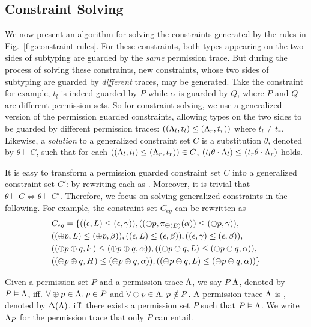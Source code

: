 {{{ \subsection{Constraint Solving}\label{sec:constraint_solve}
We now present an algorithm for solving the constraints generated by the rules in Fig.~\ref{fig:constraint-rules}.
For these constraints, both types appearing on the two sides of subtyping are
guarded by the \emph{same} permission trace. But during the process of solving these constraints, new constraints, whose two sides of subtyping are guarded by \emph{different} traces, may be generated.
Take the constraint  for example,
$t_l$ is indeed guarded by $P$ while $\alpha$ is guarded by $Q$, where $P$ and $Q$ are different permission sets.
So for constraint solving, we use a generalized version of the permission guarded constraints, allowing types on the two sides to be guarded by different permission traces:
$
((\Lambda_l,t_l)\leq(\Lambda_r,t_r))
$
where $t_l \not = t_r.$
Likewise, a \emph{solution} to a generalized constraint set $C$ is a substitution $\theta$, denoted by $\theta \vDash C$,  such that for each $((\Lambda_l,t_l)\leq(\Lambda_r,t_r)) \in C$, $(t_l\theta\cdot \Lambda_l) \leq_{} (t_r\theta \cdot \Lambda_r)$ holds.

It is easy to transform a permission guarded constraint set $C$ into a
generalized constraint set $C'$: by rewriting each  as .
Moreover, it is trivial that $\theta \vDash C \Longleftrightarrow \theta \vDash C'$.
Therefore, we focus on solving generalized constraints in the following.
For example, the constraint set $C_{eg}$ can be rewritten as
{\small
\begin{align*}
&C_{eg} = \{((\epsilon,L)\leq(\epsilon,\gamma)),
((\ominus p,\pi_{{\Theta(B)}}({\alpha}))\leq(\ominus p,\gamma)),\\
&((\oplus p,L)\leq(\oplus p,\beta)),
((\epsilon,L)\leq(\epsilon,\beta)),
((\epsilon,\gamma)\leq(\epsilon,\beta)),\\
&((\oplus p\oplus q,l_1)\leq(\oplus p\oplus q,\alpha)),
((\oplus p\ominus q,L)\leq(\oplus p\ominus q,\alpha)),\\
&((\ominus p\oplus q,H)\leq(\ominus p\oplus q,\alpha)),
((\ominus p\ominus q,L)\leq(\ominus p\ominus q,\alpha))\}
\end{align*}
}

Given a permission set $P$ and a permission trace $\Lambda$, we say $P$  $\Lambda$, denoted by $P \vDash \Lambda$, iff. $\forall \oplus p \in \Lambda. \; p\in P$ and $\forall \ominus p\in\Lambda.\; p\notin P$.
A permission trace $\Lambda$ is , denoted by $\Delta(\Lambda)$, iff. there exists a permission set $P$ such that $P\vDash \Lambda$.
We write $\Lambda_{P}$ for the permission trace that only $P$ can entail.

}}}
